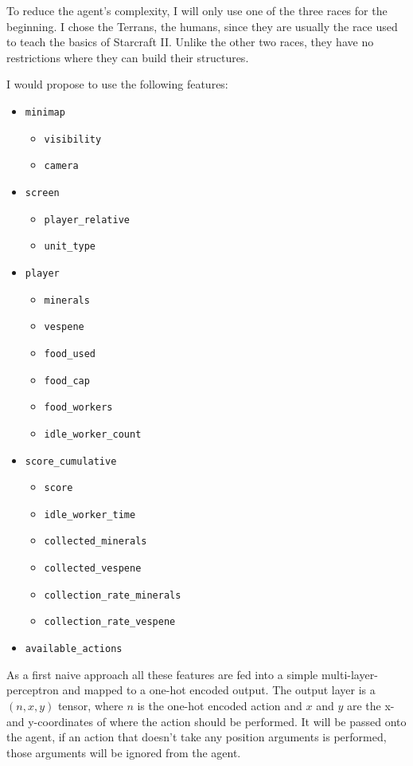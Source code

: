 \documentclass{article}
\begin{document}
To reduce the agent's complexity, I will only use one of the three races for 
the beginning. I chose the Terrans, the humans, since they are usually the race 
used to teach the basics of Starcraft II. Unlike the other two races, they have 
no restrictions where they can build their structures. 

I would propose to use the following features:
\begin{itemize}[noitemsep]
\item \texttt{minimap}
\begin{itemize}[noitemsep]
	\item \texttt{visibility}
	\item \texttt{camera}
\end{itemize}
\item \texttt{screen}
\begin{itemize}[noitemsep]
	\item \texttt{player\_relative}
	\item \texttt{unit\_type}
\end{itemize}
\item \texttt{player}
\begin{itemize}[noitemsep]
	\item \texttt{minerals}
	\item \texttt{vespene}
	\item \texttt{food\_used}
	\item \texttt{food\_cap}
	\item \texttt{food\_workers}
	\item \texttt{idle\_worker\_count}
\end{itemize}
\item \texttt{score\_cumulative}
\begin{itemize}[noitemsep]
	\item \texttt{score}
	\item \texttt{idle\_worker\_time}
	\item \texttt{collected\_minerals}
	\item \texttt{collected\_vespene}
	\item \texttt{collection\_rate\_minerals}
	\item \texttt{collection\_rate\_vespene}
\end{itemize}
\item \texttt{available\_actions}
\end{itemize}

As a first naive approach all these features are fed into a simple 
multi-layer-perceptron and mapped to a one-hot encoded output. The output layer 
is a $(n, x, y)$ tensor, where $n$ is the one-hot encoded action and $x$ and 
$y$ are the x- and y-coordinates of where the action should be performed. It 
will be passed onto the agent, if an action that doesn't take any position 
arguments is performed, those arguments will be ignored from the agent.
\end{document}
